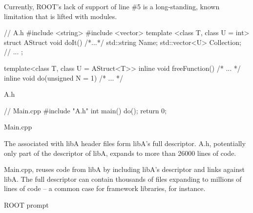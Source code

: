 \documentclass{webofc}
\begin{document}
Currently, ROOT’s lack of support of line \#5 is a long-standing, known limitation that is lifted with modules.

\begin{listing}[h]
    \noindent
    \begin{minipage}[h]{.7\textwidth}
    \begin{cppcode*}{}
    // A.h
    #include <string>
    #include <vector>
    template <class T, class U = int> struct AStruct {
      void doIt() { /*...*/ }
      std::string Name; 
      std::vector<U> Collection;
      // ...
    };

    template<class T, class U = AStruct<T>>
    inline void freeFunction() { /* ... */ }
    inline void do(unsigned N = 1) { /* ... */ }
    
    \end{cppcode*}
    \end{minipage}
    \caption{A.h}
\end{listing}

\begin{listing}[h]
    \noindent
    \begin{minipage}[h]{.7\textwidth}
    \begin{cppcode*}{}
    // Main.cpp
    #include "A.h"
    int main() {
      do();
      return 0;
    }
    \end{cppcode*}
    \end{minipage}
    \caption{Main.cpp}
\end{listing}

The associated with libA header files form libA’s full descriptor. A.h, potentially only part of the descriptor of libA, expands to more than 26000 lines of code.

Main.cpp, reuses code from libA by including libA’s descriptor and links against libA. The full descriptor can contain thousands of files expanding to millions of lines of code – a common case for framework libraries, for instance.

\begin{listing}[h]
    \noindent
    \begin{minipage}[h]{\textwidth}
    \end{minipage}
    \caption{ROOT prompt}
\end{listing}
\end{document}
